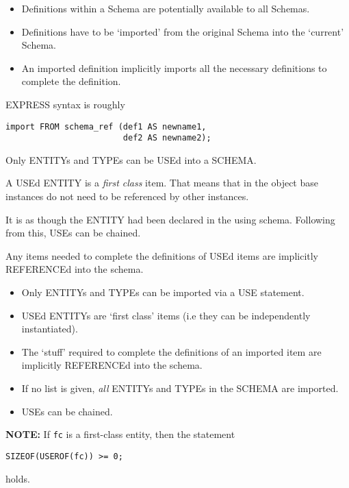 
\begin{itemize}
\item Definitions within a Schema are potentially available to all Schemas.
\item Definitions have to be `imported' from the original Schema into the
`current' Schema.
\item An imported definition implicitly imports all the necessary definitions
to complete the definition.
\end{itemize}

EXPRESS syntax is roughly
\begin{verbatim}
import FROM schema_ref (def1 AS newname1,
                        def2 AS newname2);
\end{verbatim}

\begin{remarks}
\remintro


Only ENTITYs and TYPEs can be USEd into a SCHEMA.

A USEd ENTITY is a \emph{first class} item. That means that in the object
base instances do not need to be referenced by other instances.

It is as though the ENTITY had been declared in the using schema. Following
from this, USEs can be chained.

Any items needed to complete the definitions of USEd items are
implicitly REFERENCEd into the schema.


\remend
\end{remarks}


\begin{itemize}
\item Only ENTITYs and TYPEs can be imported via a USE statement.
\item USEd ENTITYs are `first class' items (i.e they can be independently
      instantiated). 
\item The `stuff' required to complete the definitions of an imported item
      are implicitly REFERENCEd into the schema.
\item If no list is given, \emph{all} ENTITYs and TYPEs in the SCHEMA are
      imported.
\item USEs can be chained.
\end{itemize}

\textbf{NOTE:} If \verb|fc| is a first-class entity, then the statement
\begin{verbatim}
SIZEOF(USEROF(fc)) >= 0;
\end{verbatim}
holds.

